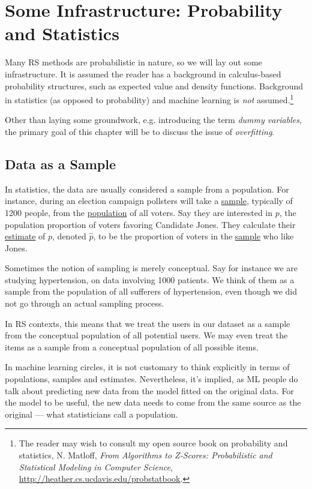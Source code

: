 \chapter{Some Infrastructure: 
Probability and Statistics}
\label{chap:infra2}   

Many RS methods are probabilistic in nature, so we will lay out some
infrastructure.  It is assumed the reader has a background in
calculus-based probability structures, such as expected value and
density functions.  Background in statistics (as opposed to probability)
and machine learning is \textit{not} assumed.\footnote{The reader may
wish to consult my open source book on probability and statistics, N.
Matloff, \textit{From Algorithms to Z-Scores: Probabilistic and
Statistical Modeling in Computer Science},
\url{http://heather.cs.ucdavis.edu/probstatbook}.}

Other than laying some groundwork, e.g. introducing the term
\textit{dummy variables}, the primary goal of this chapter will be to
discuss the issue of \textit{overfitting}.

\section{Data as a Sample}

In statistics, the data are usually considered a sample from a
population.  For instance, during an election campaign pollsters will
take a \underline{sample}, typically of 1200 people, from the
\underline{population} of all voters.  Say they are interested in $p$,
the population proportion of voters favoring Candidate Jones. They
calculate their \underline{estimate} of $p$, denoted $\widehat{p}$, to
be the proportion of voters in the \underline{sample} who like Jones.

Sometimes the notion of sampling is merely conceptual. Say for instance
we are studying hypertension, on data involving 1000 patients.  We think
of them as a sample from the population of all sufferers of
hypertension, even though we did not go through an actual sampling
process.

In RS contexts, this means that we treat the users in our dataset as a
sample from the conceptual population of all potential users.  We may
even treat the items as a sample from a conceptual population of all
possible items.

In machine learning circles, it is not customary to think explicitly in
terms of populations, samples and estimates.  Nevertheless, it's
implied, as ML people do talk about predicting new data from the model
fitted on the original data.  For the model to be useful, the new data
needs to come from the same source as the original --- what
statisticians call a population.

